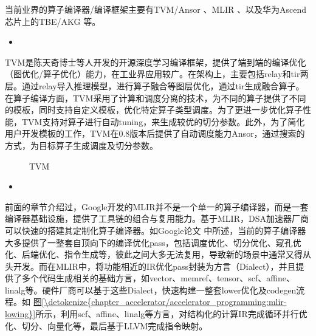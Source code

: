 \documentclass[letterpaper,10pt,english]{sphinxmanual}
\let\sphinxpxdimen\pdfpxdimen\else\newdimen\sphinxpxdimen
\begin{document}
\sphinxAtStartPar
当前业界的算子编译器/编译框架主要有TVM/Ansor
、MLIR
、以及华为Ascend芯片上的TBE/AKG
等。
\begin{itemize}
\item {} 
\sphinxAtStartPar
{}

\end{itemize}

\sphinxAtStartPar
TVM是陈天奇博士等人开发的开源深度学习编译框架，提供了端到端的编译优化（图优化/算子优化）能力，在工业界应用较广。在架构上，主要包括relay和tir两层。通过relay导入推理模型，进行算子融合等图层优化，通过tir生成融合算子。在算子编译方面，TVM采用了计算和调度分离的技术，为不同的算子提供了不同的模板，同时支持自定义模板，优化特定算子类型调度。为了更进一步优化算子性能，TVM支持对算子进行自动tuning，来生成较优的切分参数。此外，为了简化用户开发模板的工作，TVM在0.8版本后提供了自动调度能力Ansor，通过搜索的方式，为目标算子生成调度及切分参数。

\begin{figure}[H]
\centering
\capstart

\noindent\sphinxincludegraphics[width=800\sphinxpxdimen]{{TVM}.svg}
\caption{TVM}\label{\detokenize{chapter_accelerator/accelerator_programming:id18}}\label{\detokenize{chapter_accelerator/accelerator_programming:tvm}}\end{figure}
\begin{itemize}
\item {} 
\sphinxAtStartPar
{}

\end{itemize}

\sphinxAtStartPar
前面的章节介绍过，Google开发的MLIR并不是一个单一的算子编译器，而是一套编译器基础设施，提供了工具链的组合与复用能力。基于MLIR，DSA加速器厂商可以快速的搭建其定制化算子编译器。如Google论文
中所述，当前的算子编译器大多提供了一整套自顶向下的编译优化pass，包括调度优化、切分优化、窥孔优化、后端优化、指令生成等，彼此之间大多无法复用，导致新的场景中通常又得从头开发。而在MLIR中，将功能相近的IR优化pass封装为方言（Dialect），并且提供了多个代码生成相关的基础方言，如vector、memref、tensor、scf、affine、linalg等。硬件厂商可以基于这些Dialect，快速构建一整套lower优化及codegen流程。如
\hyperref[\detokenize{chapter_accelerator/accelerator_programming:mlir-lowing}]{图\ref{\detokenize{chapter_accelerator/accelerator_programming:mlir-lowing}}}所示，利用scf、affine、linalg等方言，对结构化的计算IR完成循环并行优化、切分、向量化等，最后基于LLVM完成指令映射。
\end{document}
